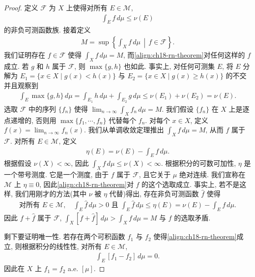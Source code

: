 \documentclass[../../main.tex]{subfiles}
\begin{document}
\begin{proof}
定义 $\mathcal{F}$ 为 $X$ 上使得对所有 $E\in\mathcal{M}$,
\begin{align*}
\int_{E}f\,d\mu\leqslant\nu(E)
\end{align*}
的非负可测函数族. 接着定义
\begin{align}
M=\sup\left\{\int_{X}f\,d\mu\,\middle|\,f\in\mathcal{F}\right\}.\label{align:ch18-rn-M}
\end{align}
我们证明存在 $f\in\mathcal{F}$ 使得 $\int_{X}f\,d\mu=M$, 而\eqref{align:ch18-rn-theorem}对任何这样的 $f$ 成立. 若 $g$ 和 $h$ 属于 $\mathcal{F}$, 则 $\max\{g,h\}$ 也如此. 事实上, 对任何可测集 $E$, 将 $E$ 分解为 $E_{1}=\{x\in X\mid g(x)<h(x)\}$ 与 $E_{2}=\{x\in X\mid g(x)\geqslant h(x)\}$ 的不交并且观察到
\begin{align*}
\int_{E}\max\{g,h\}\,d\mu=\int_{E_{1}}h\,d\mu+\int_{E_{2}}g\,d\mu\leqslant\nu(E_{1})+\nu(E_{2})=\nu(E).
\end{align*}
选取 $\mathcal{F}$ 中的序列 $\{f_{n}\}$ 使得 $\lim_{n\to\infty}\int_{X}f_{n}\,d\mu=M$. 我们假设 $\{f_{n}\}$ 在 $X$ 上是逐点递增的, 否则用 $\max\{f_{1},\cdots,f_{n}\}$ 代替每个 $f_{n}$. 对每个 $x\in X$, 定义 $f(x)=\lim_{n\to\infty}f_{n}(x)$. 我们从单调收敛定理推出 $\int_{X}f\,d\mu=M$, 从而 $f$ 属于 $\mathcal{F}$. 对所有 $E\in\mathcal{M}$, 定义
\begin{align}
\eta(E)=\nu(E)-\int_{E}f\,d\mu.\label{align:ch18-rn-eta}
\end{align}
根据假设 $\nu(X)<\infty$, 因此 $\int_{X}f\,d\mu\leqslant\nu(X)<\infty$. 根据积分的可数可加性, $\eta$ 是一个带号测度. 它是一个测度, 由于 $f$ 属于 $\mathcal{F}$, 且它关于 $\mu$ 绝对连续. 我们宣称在 $\mathcal{M}$ 上 $\eta\equiv 0$, 因此\eqref{align:ch18-rn-theorem}对 $f$ 的这个选取成立. 事实上, 若不是这样, 我们用刚才的方法(其中 $\nu$ 被 $\eta$ 代替)得出, 存在非负可测函数 $\hat{f}$ 使得
\begin{align*}
\text{对所有 }E\in\mathcal{M},\quad\int_{E}\hat{f}\,d\mu>0\text{ 且 }\int_{E}\hat{f}\,d\mu\leqslant\eta(E)=\nu(E)-\int_{E}f\,d\mu.
\end{align*}
因此 $f+\hat{f}$ 属于 $\mathcal{F}$, $\int_{X}[f+\hat{f}]\,d\mu>\int_{X}f\,d\mu=M$ 与 $f$ 的选取矛盾.

剩下要证明唯一性. 若存在两个可积函数 $f_{1}$ 与 $f_{2}$ 使得\eqref{align:ch18-rn-theorem}成立, 则根据积分的线性性, 对所有 $E\in\mathcal{M}$,
\begin{align*}
\int_{E}[f_{1}-f_{2}]\,d\mu=0.
\end{align*}
因此在 $X$ 上 $f_{1}=f_{2}$ a.e. $[\mu]$.
\end{proof}
\end{document}
